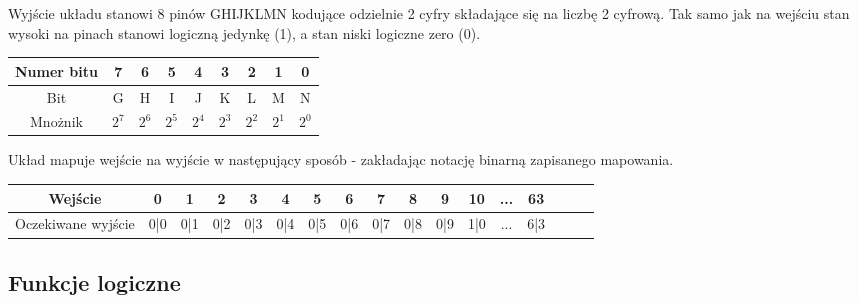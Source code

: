 \documentclass[a4paper]{article}
\begin{document}
Wyjście układu stanowi 8 pinów GHIJKLMN kodujące odzielnie 2 cyfry składające się na liczbę 2 cyfrową. Tak samo jak na wejściu stan wysoki na pinach
stanowi logiczną jedynkę (1), a stan niski logiczne zero (0). 
\begin{center}
  \begin{tabular}{|c|c|c|c|c|c|c|c|c|}
    \hline Numer bitu & 7 & 6 & 5 & 4 & 3 & 2 & 1 & 0 \\ 
    \hline Bit & G & H & I & J & K & L & M & N \\
    \hline Mnożnik & $2^7$ & $2^6$ & $2^5$ & $2^4$ & $2^3$ & $2^2$ & $2^1$ & $2^0$ \\
    \hline
  \end{tabular}
\end{center}

Układ mapuje wejście na wyjście w następujący sposób - zakładając notację binarną zapisanego mapowania.

\begin{center}
  \begin{tabular}{|c|c|c|c|c|c|c|c|c|c|c|c|c|c|c|c|c|}
  \hline Wejście & 0 & 1 & 2 & 3 & 4 & 5 & 6 & 7 & 8 & 9 & 10 & ... & 63 \\
  \hline Oczekiwane wyjście & 0|0 & 0|1 & 0|2 & 0|3 & 0|4 & 0|5 & 0|6 & 0|7 & 0|8 & 0|9 & 1|0 & ... & 6|3 \\
  \hline
  \end{tabular}
  \end{center}

\subsection{Funkcje logiczne}
\pagebreak
\end{document}
